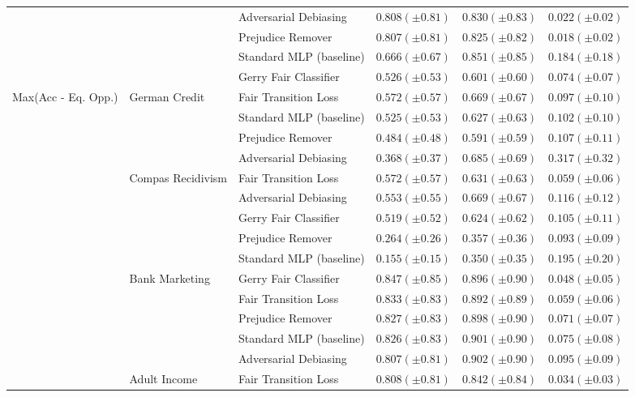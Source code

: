 \begin{tabular}{llllll}
 &  & Adversarial Debiasing & $0.808 (\pm0.81)$ & $0.830 (\pm0.83)$ & $0.022 (\pm0.02)$ \\
 &  & Prejudice Remover & $0.807 (\pm0.81)$ & $0.825 (\pm0.82)$ & $0.018 (\pm0.02)$ \\
 &  & Standard MLP (baseline) & $0.666 (\pm0.67)$ & $0.851 (\pm0.85)$ & $0.184 (\pm0.18)$ \\
 &  & Gerry Fair Classifier & $0.526 (\pm0.53)$ & $0.601 (\pm0.60)$ & $0.074 (\pm0.07)$ \\
\cline{1-6} \cline{2-6}
\multirow[t]{19}{*}{Max(Acc - Eq. Opp.)} & \multirow[t]{4}{*}{German Credit} & Fair Transition Loss & $0.572 (\pm0.57)$ & $0.669 (\pm0.67)$ & $0.097 (\pm0.10)$ \\
 &  & Standard MLP (baseline) & $0.525 (\pm0.53)$ & $0.627 (\pm0.63)$ & $0.102 (\pm0.10)$ \\
 &  & Prejudice Remover & $0.484 (\pm0.48)$ & $0.591 (\pm0.59)$ & $0.107 (\pm0.11)$ \\
 &  & Adversarial Debiasing & $0.368 (\pm0.37)$ & $0.685 (\pm0.69)$ & $0.317 (\pm0.32)$ \\
\cline{2-6}
 & \multirow[t]{5}{*}{Compas Recidivism} & Fair Transition Loss & $0.572 (\pm0.57)$ & $0.631 (\pm0.63)$ & $0.059 (\pm0.06)$ \\
 &  & Adversarial Debiasing & $0.553 (\pm0.55)$ & $0.669 (\pm0.67)$ & $0.116 (\pm0.12)$ \\
 &  & Gerry Fair Classifier & $0.519 (\pm0.52)$ & $0.624 (\pm0.62)$ & $0.105 (\pm0.11)$ \\
 &  & Prejudice Remover & $0.264 (\pm0.26)$ & $0.357 (\pm0.36)$ & $0.093 (\pm0.09)$ \\
 &  & Standard MLP (baseline) & $0.155 (\pm0.15)$ & $0.350 (\pm0.35)$ & $0.195 (\pm0.20)$ \\
\cline{2-6}
 & \multirow[t]{5}{*}{Bank Marketing} & Gerry Fair Classifier & $0.847 (\pm0.85)$ & $0.896 (\pm0.90)$ & $0.048 (\pm0.05)$ \\
 &  & Fair Transition Loss & $0.833 (\pm0.83)$ & $0.892 (\pm0.89)$ & $0.059 (\pm0.06)$ \\
 &  & Prejudice Remover & $0.827 (\pm0.83)$ & $0.898 (\pm0.90)$ & $0.071 (\pm0.07)$ \\
 &  & Standard MLP (baseline) & $0.826 (\pm0.83)$ & $0.901 (\pm0.90)$ & $0.075 (\pm0.08)$ \\
 &  & Adversarial Debiasing & $0.807 (\pm0.81)$ & $0.902 (\pm0.90)$ & $0.095 (\pm0.09)$ \\
\cline{2-6}
 & \multirow[t]{5}{*}{Adult Income} & Fair Transition Loss & $0.808 (\pm0.81)$ & $0.842 (\pm0.84)$ & $0.034 (\pm0.03)$ \\

\end{tabular}
